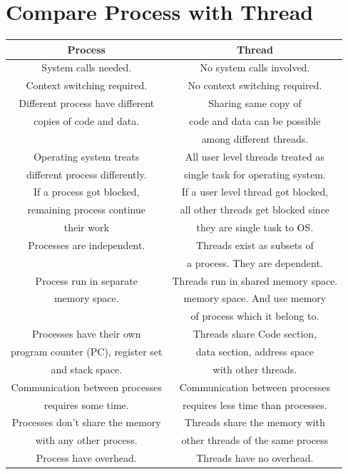 \documentclass[11pt,a4paper]{report}
\begin{document}
  	\section{Compare Process with Thread}
  	\begin{tabular}{|c|c|}
  	\hline 
  	\textbf{Process} & \textbf{Thread} \\ 
  	\hline 
  	System calls needed. & No system calls involved. \\ 
  	\hline 
  	Context switching required. & No context switching required. \\ 
  	\hline 
  	Different process have different  & Sharing same copy of \\ copies of code and data. & code and data can be possible \\ & among different threads. \\
  	\hline 
  	Operating system treats &  All user level threads treated as \\different process differently. & single task for operating system. \\ 
  	\hline 
  	If a process got blocked,  & If a user level thread got blocked, \\ remaining process continue & all other threads get blocked since \\their work & they are single task to OS. \\ 
  	\hline 
  	Processes are independent. & Threads exist as subsets of  \\ &a process. They are dependent. \\ 
  	\hline 
  	Process run in separate  & Threads run in shared memory space.\\ memory space. & memory space. And use memory  \\ & of process which it belong to.\\ 
  	\hline 
  	Processes have their own & Threads share Code section, \\ program counter (PC), register set& data section, address space \\  and stack space. & with other threads.\\
  	\hline 
  	 Communication between processes  & Communication between processes \\ requires some time. &requires less time than processes. \\ 
  	\hline 
  	Processes don’t share the memory & Threads share the memory with\\with any other process. & other threads of the same process \\ 
  	\hline 
  	Process have overhead. & Threads have no overhead. \\ 
  	\hline 
  	\end{tabular}
  	
\end{document}
